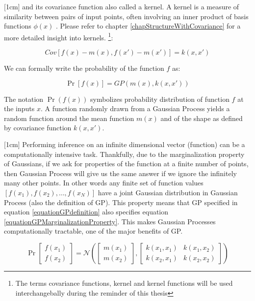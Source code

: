 [1cm]
and its covariance function also called a kernel. A kernel is a measure of similarity between pairs of input points, often involving an inner product of basis functions \(\phi(x)\) \cite{bishop2006pattern}. Please refer to chapter \ref{chapStructureWithCovariance} for a more detailed insight into kernels.   \footnote{The terms covariance functions, kernel and kernel functions will be used interchangebally during the reminder of this thesis}:

\begin{equation}\label{eq:covarianceGP}
Cov[f(x) - m(x), f(x') - m(x')] = k(x, x')
\end{equation}

We can formally write the probability of the function \(f\) as:

\begin{equation}\label{equationGPdefinition}
\Pr[f(x)] = GP(m(x), k(x, x'))
\end{equation}

The notation \(\Pr(f( x))\) symbolizes probability distribution of function \(f\) at the inputs \(x\). A function randomly drawn from a Gaussian Process yields a random function around the mean function \(m(x)\) and of the shape as defined by covariance function \(k(x, x')\). 

[1cm]
Performing inference on an infinite dimensional vector (function) can be a computationally intensive task. Thankfully, due to the marginalization property of Gaussians, if we ask for properties of the function at a finite number of points, then  Gaussian Process will give us the same answer if we ignore the infinitely many other points. In other words any finite set of function values \([f(x_{1}), f(x_{2}), \ldots, f(x_{N})]\) have a joint Gaussian distribution in Gaussian Process (also the  definition of GP). This property means that GP specified in equation \ref{equationGPdefinition} also specifies equation \ref{equationGPMarginalizationProperty}. This makes Gaussian Processes computationally tractable, one of the major benefits of GP. 


\begin{equation}\label{equationGPMarginalizationProperty}
\Pr\left [ \begin{matrix}
f(x_{1})
\\ f(x_{2})
\end{matrix} \right ] = \mathcal{N}\left (\left [ \begin{matrix}
m(x_{1})
\\ m(x_{2})

\end{matrix} \right ] , \left [ \begin{matrix}
k(x_{1}, x_{1}) & k(x_{1}, x_{2})\\ 
k(x_{2}, x_{1}) & k(x_{2}, x_{2})
\end{matrix} \right ] \right )
\end{equation}

